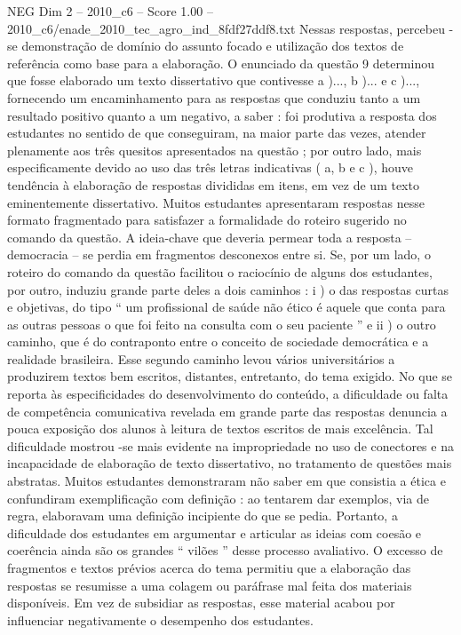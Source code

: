 \begin{textsample}{NEG Dim 2 – 2010\_c6 – Score 1.00 – 2010\_c6/enade\_2010\_tec\_agro\_ind\_8fdf27ddf8.txt}
Nessas respostas, percebeu -se demonstração de domínio do assunto focado e utilização dos textos de referência como base para a elaboração.
O enunciado da questão 9 determinou que fosse elaborado um texto dissertativo que contivesse a )..., b )... e c )..., fornecendo um encaminhamento para as respostas que conduziu tanto a um resultado positivo quanto a um negativo, a saber : foi produtiva a resposta dos estudantes no sentido de que conseguiram, na maior parte das vezes, atender plenamente aos três quesitos apresentados na questão ; por outro lado, mais especificamente devido ao uso das três letras indicativas ( a, b e c ), houve tendência à elaboração de respostas divididas em itens, em vez de um texto eminentemente dissertativo.
Muitos estudantes apresentaram respostas nesse formato fragmentado para satisfazer a formalidade do roteiro sugerido no comando da questão.
A ideia-chave que deveria permear toda a resposta – democracia – se perdia em fragmentos desconexos entre si.
Se, por um lado, o roteiro do comando da questão facilitou o raciocínio de alguns dos estudantes, por outro, induziu grande parte deles a dois caminhos : i ) o das respostas curtas e objetivas, do tipo “ um profissional de saúde não ético é aquele que conta para as outras pessoas o que foi feito na consulta com o seu paciente ” e ii ) o outro caminho, que é do contraponto entre o conceito de sociedade democrática e a realidade brasileira.
Esse segundo caminho levou vários universitários a produzirem textos bem escritos, distantes, entretanto, do tema exigido.
No que se reporta às especificidades do desenvolvimento do conteúdo, a dificuldade ou falta de competência comunicativa revelada em grande parte das respostas denuncia a pouca exposição dos alunos à leitura de textos escritos de mais excelência.
Tal dificuldade mostrou -se mais evidente na impropriedade no uso de conectores e na incapacidade de elaboração de texto dissertativo, no tratamento de questões mais abstratas.
Muitos estudantes demonstraram não saber em que consistia a ética e confundiram exemplificação com definição : ao tentarem dar exemplos, via de regra, elaboravam uma definição incipiente do que se pedia.
Portanto, a dificuldade dos estudantes em argumentar e articular as ideias com coesão e coerência ainda são os grandes “ vilões ” desse processo avaliativo.
O excesso de fragmentos e textos prévios acerca do tema permitiu que a elaboração das respostas se resumisse a uma colagem ou paráfrase mal feita dos materiais disponíveis.
Em vez de subsidiar as respostas, esse material acabou por influenciar negativamente o desempenho dos estudantes.

\end{textsample}
